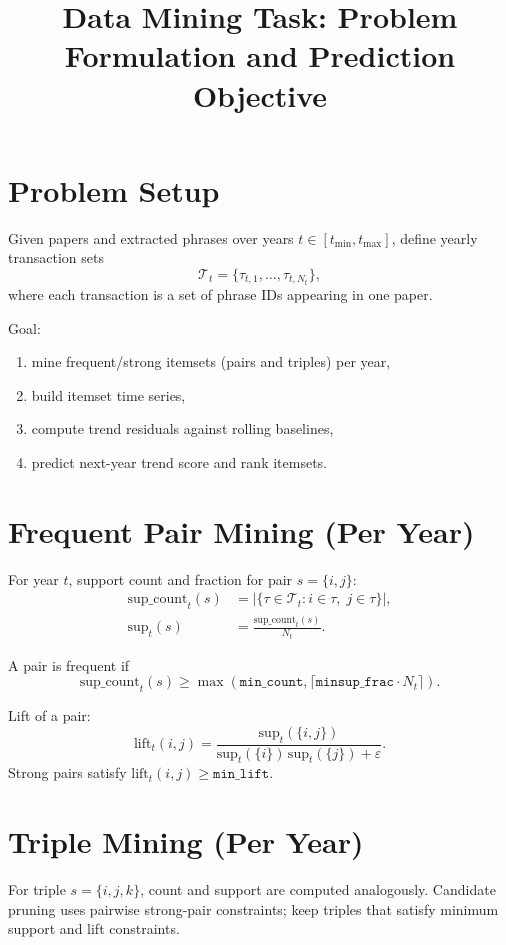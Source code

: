 \documentclass[11pt]{article}
\title{Data Mining Task: Problem Formulation and Prediction Objective}
\author{}
\date{}
\begin{document}
\maketitle

\section{Problem Setup}
Given papers and extracted phrases over years $t\in[t_{\min},t_{\max}]$, define yearly transaction sets
\begin{equation}
\mathcal{T}_t = \{\tau_{t,1},\dots,\tau_{t,N_t}\},
\end{equation}
where each transaction is a set of phrase IDs appearing in one paper.

Goal:
\begin{enumerate}[leftmargin=1.5em]
  \item mine frequent/strong itemsets (pairs and triples) per year,
  \item build itemset time series,
  \item compute trend residuals against rolling baselines,
  \item predict next-year trend score and rank itemsets.
\end{enumerate}

\section{Frequent Pair Mining (Per Year)}
For year $t$, support count and fraction for pair $s=\{i,j\}$:
\begin{align}
\mathrm{sup\_count}_t(s) &= \left|\{\tau\in\mathcal{T}_t: i\in\tau,\;j\in\tau\}\right|,\\
\mathrm{sup}_t(s) &= \frac{\mathrm{sup\_count}_t(s)}{N_t}.
\end{align}

A pair is frequent if
\begin{equation}
\mathrm{sup\_count}_t(s) \ge \max(\texttt{min\_count},\lceil \texttt{minsup\_frac}\cdot N_t\rceil).
\end{equation}

Lift of a pair:
\begin{equation}
\mathrm{lift}_t(i,j)=\frac{\mathrm{sup}_t(\{i,j\})}{\mathrm{sup}_t(\{i\})\,\mathrm{sup}_t(\{j\})+\varepsilon}.
\end{equation}
Strong pairs satisfy $\mathrm{lift}_t(i,j)\ge \texttt{min\_lift}$.

\section{Triple Mining (Per Year)}
For triple $s=\{i,j,k\}$, count and support are computed analogously.
Candidate pruning uses pairwise strong-pair constraints; keep triples that satisfy minimum support and lift constraints.
\end{document}
